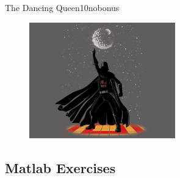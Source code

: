 \documentclass[twoside,english,colorbacktitle,accentcolor=tud9c,10pt]{tudexercise}
\begin{document}
\begin{questions}
\begin{question}{The Dancing Queen}{10}{nobonus}
\begin{enumerate}
\begin{figure}[H]
		\centering
		\includegraphics[height=5cm]{vader.jpg}
		\end{figure}
	\end{enumerate}
\end{question}

\end{questions}


\subsection{Matlab Exercises}
\end{document}
